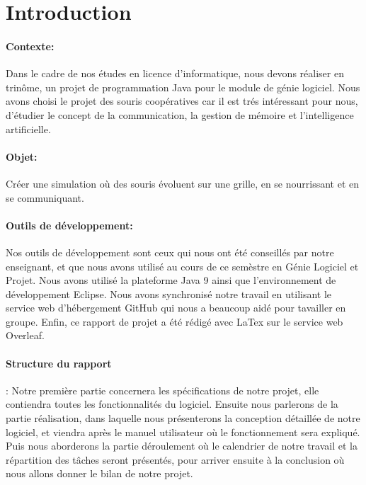 \section{Introduction}
\label{sec:introduction}

\paragraph{Contexte:}
Dans le cadre de nos études en licence d'informatique, nous devons réaliser en trinôme, un projet de programmation Java pour le module de génie logiciel. Nous avons choisi le projet des souris coopératives car il est trés intéressant pour nous, d'étudier le concept de la communication, la gestion de mémoire et l'intelligence artificielle.

\paragraph{Objet:}
Créer une simulation où des souris évoluent sur une grille, en se nourrissant et en se communiquant.

\paragraph{Outils de développement:}
Nos outils de développement sont ceux qui nous ont été conseillés par notre enseignant, et que nous avons utilisé au cours de ce semèstre en Génie Logiciel et Projet. Nous avons utilisé la plateforme Java 9 ainsi que l'environnement de développement Eclipse. Nous avons synchronisé notre travail en utilisant le service web d'hébergement GitHub qui nous a beaucoup aidé pour tavailler en groupe. Enfin, ce rapport de projet a été rédigé avec LaTex sur le service web Overleaf.

\paragraph{Structure du rapport}:
Notre première partie concernera les spécifications de notre projet, elle contiendra toutes les fonctionnalités du logiciel. Ensuite nous parlerons de la partie réalisation, dans laquelle nous présenterons la conception détaillée de notre logiciel, et viendra après le manuel utilisateur où le fonctionnement sera expliqué. Puis nous aborderons la partie déroulement où le calendrier de notre travail et la répartition des tâches seront présentés, pour arriver ensuite à la conclusion où nous allons donner le bilan de notre projet.